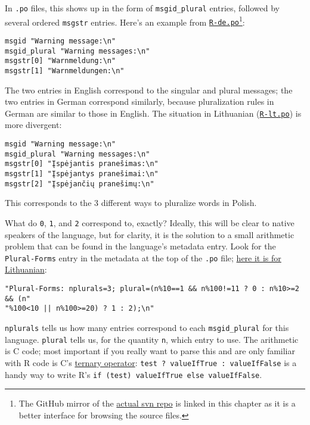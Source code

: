 \documentclass[
  letterpaper,
  DIV=11,
  numbers=noendperiod]{scrreprt}
\begin{document}
In \texttt{.po} files, this shows up in the form of
\texttt{msgid\_plural} entries, followed by several ordered
\texttt{msgstr} entries. Here's an example from
\href{https://github.com/r-devel/r-svn/blob/c715d61cb74b3fee2d035faed9b258e86e420b75/src/library/base/po/R-de.po\#L2015-L2018}{\texttt{R-de.po}}\footnote{The
  GitHub mirror of the \href{https://svn.r-project.org/R/trunk/}{actual
  svn repo} is linked in this chapter as it is a better interface for
  browsing the source files.}:

\begin{verbatim}
msgid "Warning message:\n"
msgid_plural "Warning messages:\n"
msgstr[0] "Warnmeldung:\n"
msgstr[1] "Warnmeldungen:\n"
\end{verbatim}

The two entries in English correspond to the singular and plural
messages; the two entries in German correspond similarly, because
pluralization rules in German are similar to those in English. The
situation in Lithuanian
(\href{https://github.com/r-devel/r-svn/blob/c715d61cb74b3fee2d035faed9b258e86e420b75/src/library/base/po/R-lt.po\#L1999-L2003}{\texttt{R-lt.po}})
is more divergent:

\begin{verbatim}
msgid "Warning message:\n"
msgid_plural "Warning messages:\n"
msgstr[0] "Įspėjantis pranešimas:\n"
msgstr[1] "Įspėjantys pranešimai:\n"
msgstr[2] "Įspėjančių pranešimų:\n"
\end{verbatim}

This corresponds to the 3 different ways to pluralize words in Polish.

What do \texttt{0}, \texttt{1}, and \texttt{2} correspond to, exactly?
Ideally, this will be clear to native speakers of the language, but for
clarity, it is the solution to a small arithmetic problem that can be
found in the language's metadata entry. Look for the
\texttt{Plural-Forms} entry in the metadata at the top of the
\texttt{.po} file;
\href{https://github.com/r-devel/r-svn/blob/c715d61cb74b3fee2d035faed9b258e86e420b75/src/library/base/po/R-lt.po\#L18-L19}{here
it is for Lithuanian}:

\begin{verbatim}
"Plural-Forms: nplurals=3; plural=(n%10==1 && n%100!=11 ? 0 : n%10>=2 && (n"
"%100<10 || n%100>=20) ? 1 : 2);\n"
\end{verbatim}

\texttt{nplurals} tells us how many entries correspond to each
\texttt{msgid\_plural} for this language. \texttt{plural} tells us, for
the quantity \texttt{n}, which entry to use. The arithmetic is C code;
most important if you really want to parse this and are only familiar
with R code is C's \href{https://en.wikipedia.org/wiki/\%3F:}{ternary
operator}: \texttt{test\ ?\ valueIfTrue\ :\ valueIfFalse} is a handy way
to write R's \texttt{if\ (test)\ valueIfTrue\ else\ valueIfFalse}.
\end{document}
